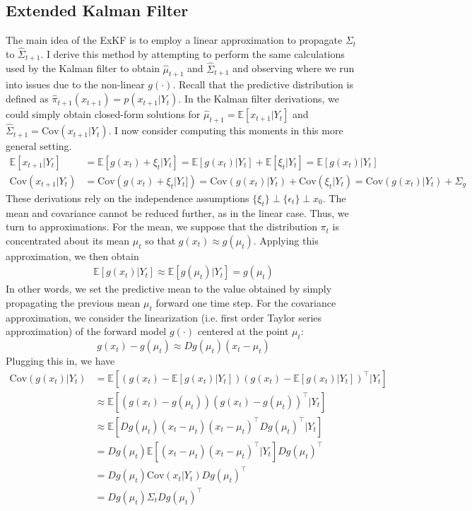 \documentclass[12pt]{article}
\newcommand{\E}{\mathbb{E}}
\newcommand{\Cov}{\mathrm{Cov}}
\begin{document}
\subsection{Extended Kalman Filter}
The main idea of the ExKF is to employ a linear approximation to propagate $\Sigma_t$ to $\hat{\Sigma}_{t + 1}$. I derive this method by attempting to perform the same 
calculations used by the Kalman filter to obtain $\hat{\mu}_{t + 1}$ and $\hat{\Sigma}_{t + 1}$ and observing where we run into issues due to the non-linear $g(\cdot)$. 
Recall that the predictive distribution is defined as $\hat{\pi}_{t + 1}(x_{t+1}) = p(x_{t+1}|Y_t)$. In the Kalman filter derivations, we could simply obtain closed-form 
solutions for $\hat{\mu}_{t + 1} = \E[x_{t + 1}|Y_t]$ and $\hat{\Sigma}_{t+1} = \Cov(x_{t+1}|Y_t)$. I now consider computing this moments in this more general setting. 
\begin{align*}
\E[x_{t + 1}|Y_t] &= \E\left[g(x_t) + \xi_t|Y_t\right] = \E\left[g(x_t)|Y_t\right] + \E[\xi_t|Y_t] = \E\left[g(x_t)|Y_t\right] \\
\Cov(x_{t+1}|Y_t) &= \Cov\left(g(x_t) + \xi_t|Y_t]\right) = \Cov\left(g(x_t)|Y_t\right) + \Cov(\xi_t|Y_t) = \Cov\left(g(x_t)|Y_t\right) + \Sigma_g
\end{align*}
These derivations rely on the independence assumptions $\{\xi_t\} \perp \{\epsilon_t\} \perp x_0$. The mean and covariance cannot be reduced further, as in the linear 
case. Thus, we turn to approximations. For the mean, we suppose that the distribution $\pi_t$ is concentrated about its mean $\mu_t$ so that $g(x_t) \approx g(\mu_t)$. 
Applying this approximation, we then obtain  
\begin{align*}
\E\left[g(x_t)|Y_t\right] \approx \E\left[g(\mu_t) |Y_t \right] = g(\mu_t)
\end{align*}
In other words, we set the predictive mean to the value obtained by simply propagating the previous mean $\mu_t$ forward one time step. For the covariance approximation, 
we consider the linearization (i.e. first order Taylor series approximation) of the forward model $g(\cdot)$ centered at the point $\mu_t$: 
\[g(x_t) - g(\mu_t) \approx Dg(\mu_t)\left(x_t - \mu_t \right) \]
 Plugging this in, we have 
 \begin{align*}
 \Cov\left(g(x_t)|Y_t\right) &= \E\left[\left(g(x_t) - \E[g(x_t)|Y_t]\right)\left(g(x_t) - \E[g(x_t)|Y_t]\right)^{\top} | Y_t \right] \\
 				       &\approx \E\left[\left(g(x_t) - g(\mu_t)\right)\left(g(x_t) - g(\mu_t)\right)^{\top} | Y_t \right] \\
				       &\approx \E\left[Dg(\mu_t)\left(x_t - \mu_t \right) \left(x_t - \mu_t \right)^{\top} Dg(\mu_t)^\top  | Y_t \right] \\
				       &= Dg(\mu_t) \E\left[\left(x_t - \mu_t \right) \left(x_t - \mu_t \right)^{\top} | Y_t \right] Dg(\mu_t)^\top \\
				       &= Dg(\mu_t) \Cov(x_t|Y_t) Dg(\mu_t)^\top \\
				       &= Dg(\mu_t) \Sigma_t Dg(\mu_t)^\top
 \end{align*}
\end{document}
